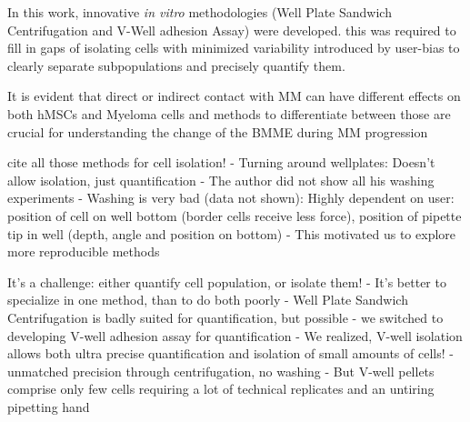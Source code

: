 


%
\label{sec:discussion_novel_methods}%

In this work, innovative \textit{in vitro} methodologies (Well Plate Sandwich
Centrifugation and V-Well adhesion Assay) were developed. this was required to
fill in gaps of isolating cells with minimized variability introduced by
user-bias to clearly separate subpopulations and precisely quantify them.


It is evident that direct or indirect contact with MM can have different effects
on both hMSCs and Myeloma cells and methods to differentiate between those are
crucial for understanding the change of the \ac{BMME} during \ac{MM} progression
\cite{fairfieldMultipleMyelomaCells2020, dziadowiczBoneMarrowStromaInduced2022}

cite all those methods for cell isolation!
- Turning around wellplates: Doesn't allow isolation, just quantification
- The author did not show all his washing experiments
- Washing is very bad (data not shown): Highly dependent on user:
position of cell on well bottom (border cells receive less force), position of
pipette tip in well (depth, angle and position on bottom)
- This motivated us to explore more reproducible methods

It's a challenge: either quantify cell population, or isolate them!
- It's better to specialize in one method, than to do both poorly
- Well Plate Sandwich Centrifugation is badly suited for quantification, but possible
- we switched to developing V-well adhesion assay for quantification
- We realized, V-well isolation allows both ultra precise quantification and
isolation of small amounts of cells!
- unmatched precision through centrifugation, no washing
- But V-well pellets comprise only few cells requiring a lot of technical
replicates and an untiring pipetting hand %


